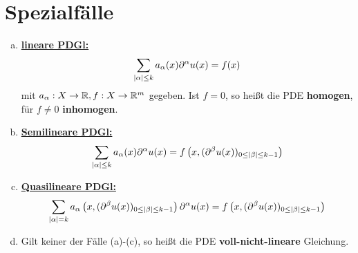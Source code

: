\section{Spezialfälle}
\begin{enumerate}[(a)]
\item {} \underline{\textbf{lineare PDGl:}}
  \[ \sum\limits_{\lvert \alpha\rvert\leq k}a_\alpha(x)\partial^\alpha u(x)=f(x) \]
  mit $a_\alpha:X\rightarrow\mathbb{R}, f:X\rightarrow\mathbb{R}^m$ gegeben. Ist $f=0$, so heißt die PDE \textbf{homogen}, für $f\neq 0$ \textbf{inhomogen}.
\item {} \underline{\textbf{Semilineare PDGl:}}
  \[ \sum\limits_{\lvert \alpha\rvert\leq k}a_\alpha(x)\partial^\alpha u(x)=f\left(x,(\partial^\beta u(x))_{0\leq\lvert \beta\rvert\leq k-1}\right) \]
\item {} \underline{\textbf{Quasilineare PDGl:}}
  \[ \sum\limits_{\lvert \alpha\rvert=k}a_\alpha\left( x, (\partial^\beta u(x))_{0\leq\lvert \beta\rvert\leq k-1} \right)\partial^\alpha u(x) = f\left( x, (\partial^\beta u(x))_{0\leq\lvert \beta\rvert\leq k-1}\right) \]
\item {} Gilt keiner der Fälle (a)-(c), so heißt die PDE \textbf{voll-nicht-lineare} Gleichung.
\end{enumerate}


